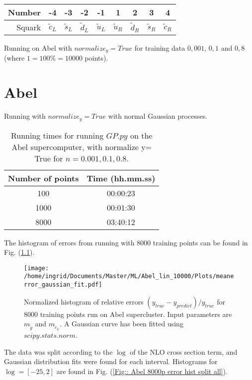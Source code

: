 \documentclass[twoside,english]{uiofysmaster}
\begin{document}
\begin{table}[H]
\begin{tabular}{|r|c|c|c|c|c|c|c|c|}
\hline
Number & -4 & -3 & -2 & -1 & 1 & 2 & 3 & 4\\
\hline
Squark & $\tilde{c}_L$ & $\tilde{s}_L$ & $\tilde{d}_L$ & $\tilde{u}_L$ & $\tilde{u}_R$ & $\tilde{d}_R$ & $\tilde{s}_R$ & $\tilde{c}_R$\\
\hline
\end{tabular}
\end{table}

Running on Abel with $normalize_y=True$ for training data $0,001$, $0,1$ and $0,8$ (where $1=100\%=10 000$ points).


\chapter{Abel}
Running with $normalize_y=True$ with normal Gaussian processes.
\begin{table}[H]
\centering
\begin{tabular}{|c|c|}
\hline
Number of points & Time (hh.mm.ss)\\
\hline
100 & 00:00:23\\
1000 & 00:01:30\\
8000 & 03:40:12\\
\hline
\end{tabular}
\caption{Running times for running $GP.py$ on the Abel supercomputer, with normalize y= True for $n=0.001,0.1,0.8$.}
\end{table}

The histogram of errors from running with 8000 training points can be found in Fig. (\ref{Fig:: Abel 8000p error hist}).

\begin{figure}[H]
\centering
\texttt{[image: /home/ingrid/Documents/Master/ML/Abel\_lin\_10000/Plots/meanerror\_gaussian\_fit.pdf]}
\caption{Normalized histogram of relative errors $(y_{true} - y_{predict})/y_{true}$ for 8000 training points run on Abel supercluster. Input parameters are $m_{\tilde{g}}$ and $m_{\tilde{c}_L}$. A Gaussian curve has been fitted using $scipy.stats.norm$.}
\label{Fig:: Abel 8000p error hist}
\end{figure}


The data was split according to the $\log$ of the NLO cross section term, and Gaussian distribution fits were found for each interval. Histograms for $\log= [-25, 2]$ are found in Fig. (\ref{Fig:: Abel 8000p error hist split all}).
\end{document}
